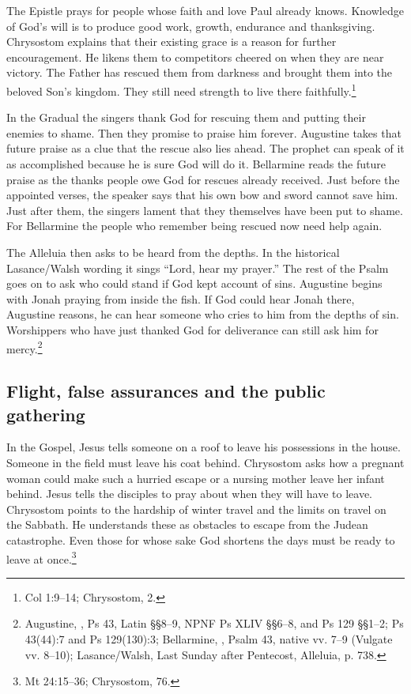 The Epistle prays for people whose faith and love Paul already knows.
Knowledge of God's will is to produce good work, growth, endurance and
thanksgiving. Chrysostom explains that their existing grace is a reason for
further encouragement. He likens them to competitors cheered on when
they are near victory. The Father has rescued them from darkness and
brought them into the beloved Son's kingdom. They still need strength to
live there faithfully.\footnote{Col 1:9--14; Chrysostom,
 2.}

In the Gradual the singers thank God for rescuing them and putting their
enemies to shame. Then they promise to praise him forever. Augustine
takes that future praise as a clue that the rescue also lies ahead. The
prophet can speak of it as accomplished because he is sure God will do
it. Bellarmine reads the future praise as the thanks people owe God for
rescues already received. Just before the appointed verses, the speaker
says that his own bow and sword cannot save him. Just after them, the
singers lament that they themselves have been put to shame. For
Bellarmine the people who remember being rescued now need help again.

The Alleluia then asks to be heard from the depths. In the historical
Lasance/Walsh wording it sings ``Lord, hear my prayer.'' The rest of the
Psalm goes on to ask who could stand if God kept account of sins.
Augustine begins with Jonah praying from inside the fish. If God could
hear Jonah there, Augustine reasons, he can hear someone who cries to
him from the depths of sin. Worshippers who have just thanked God for
deliverance can still ask him for mercy.\footnote{Augustine,
, Ps 43, Latin §§8--9, NPNF Ps XLIV
§§6--8, and Ps 129 §§1--2; Ps 43(44):7 and Ps 129(130):3;
Bellarmine, , Psalm 43, native vv. 7--9 (Vulgate vv. 8--10);
Lasance/Walsh, Last Sunday after Pentecost, Alleluia, p. 738.}

\clearpage
\subsection{Flight, false assurances and the public gathering}

In the Gospel, Jesus tells someone on a roof to leave his possessions in
the house. Someone in the field must leave his coat behind. Chrysostom
asks how a pregnant woman could make such a hurried escape or a nursing
mother leave her infant behind. Jesus tells the disciples to pray about
when they will have to leave. Chrysostom points to the hardship of
winter travel and the limits on travel on the Sabbath. He understands
these as obstacles to escape from the Judean catastrophe. Even those
for whose sake God shortens the days must be ready to leave at
once.\footnote{Mt 24:15--36; Chrysostom,
 76.}


